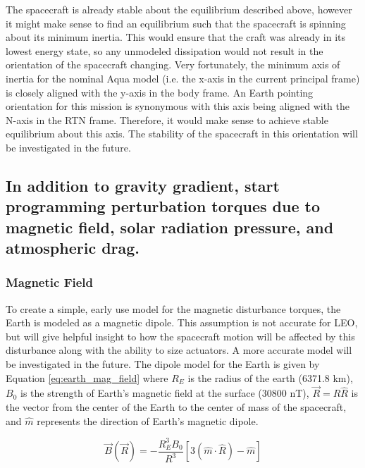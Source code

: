 The spacecraft is already stable about the equilibrium described above, however it might make sense to find an equilibrium such that the spacecraft is spinning about its minimum inertia. This would ensure that the craft was already in its lowest energy state, so any unmodeled dissipation would not result in the orientation of the spacecraft changing. Very fortunately, the minimum axis of inertia for the nominal Aqua model (i.e. the x-axis in the current principal frame) is closely aligned with the y-axis in the body frame. An Earth pointing orientation for this mission is synonymous with this axis being aligned with the N-axis in the RTN frame. Therefore, it would make sense to achieve stable equilibrium about this axis. The stability of the spacecraft in this orientation will be investigated in the future.

\subsection{In addition to gravity gradient, start programming perturbation torques due to magnetic field, solar radiation pressure, and atmospheric drag.}

\subsubsection{Magnetic Field}

To create a simple, early use model for the magnetic disturbance torques, the Earth is modeled as a magnetic dipole. This assumption is not accurate for LEO, but will give helpful insight to how the spacecraft motion will be affected by this disturbance along with the ability to size actuators. A more accurate model will be investigated in the future. The dipole model for the Earth is given by Equation \ref{eq:earth_mag_field} where $R_E$ is the radius of the earth (6371.8 km), $B_0$ is the strength of Earth's magnetic field at the surface (30800 nT), $\vec{R} = R \hat{R}$ is the vector from the center of the Earth to the center of mass of the spacecraft, and $\hat{m}$ represents the direction of Earth's magnetic dipole.

\begin{equation} \label{eq:earth_mag_field}
    \vec{B}(\vec{R}) = -\frac{R_E^3 B_0}{R^3} \left[ 3\left( \hat{m} \cdot \hat{R} \right) - \hat{m} \right]
\end{equation}


